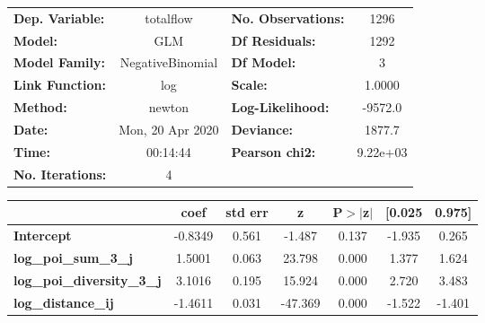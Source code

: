 \begin{center}
\begin{tabular}{lclc}
\toprule
\textbf{Dep. Variable:}            &    totalflow     & \textbf{  No. Observations:  } &     1296    \\
\textbf{Model:}                    &       GLM        & \textbf{  Df Residuals:      } &     1292    \\
\textbf{Model Family:}             & NegativeBinomial & \textbf{  Df Model:          } &        3    \\
\textbf{Link Function:}            &       log        & \textbf{  Scale:             } &    1.0000   \\
\textbf{Method:}                   &      newton      & \textbf{  Log-Likelihood:    } &   -9572.0   \\
\textbf{Date:}                     & Mon, 20 Apr 2020 & \textbf{  Deviance:          } &    1877.7   \\
\textbf{Time:}                     &     00:14:44     & \textbf{  Pearson chi2:      } &  9.22e+03   \\
\textbf{No. Iterations:}           &        4         & \textbf{                     } &             \\
\bottomrule
\end{tabular}
\begin{tabular}{lcccccc}
                                   & \textbf{coef} & \textbf{std err} & \textbf{z} & \textbf{P$> |$z$|$} & \textbf{[0.025} & \textbf{0.975]}  \\
\midrule
\textbf{Intercept}                 &      -0.8349  &        0.561     &    -1.487  &         0.137        &       -1.935    &        0.265     \\
\textbf{log\_poi\_sum\_3\_j}       &       1.5001  &        0.063     &    23.798  &         0.000        &        1.377    &        1.624     \\
\textbf{log\_poi\_diversity\_3\_j} &       3.1016  &        0.195     &    15.924  &         0.000        &        2.720    &        3.483     \\
\textbf{log\_distance\_ij}         &      -1.4611  &        0.031     &   -47.369  &         0.000        &       -1.522    &       -1.401     \\
\bottomrule
\end{tabular}
\end{center}